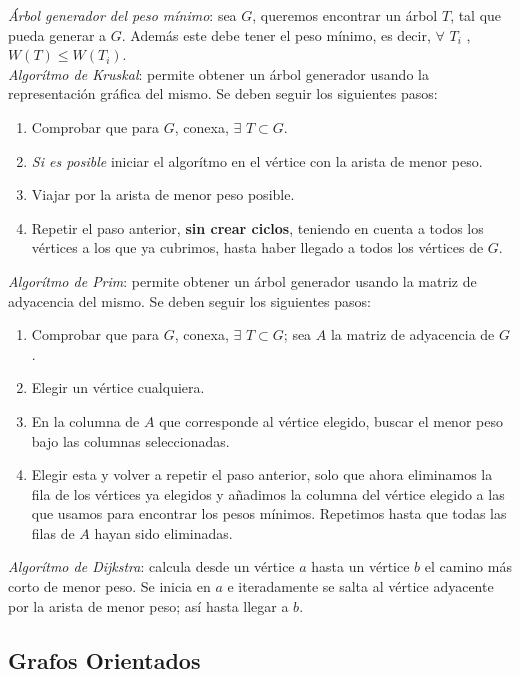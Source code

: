 \documentclass[titlepage,a4paper,12pt,twoside]{article}
\begin{document}
\textit{Árbol generador del peso mínimo}: sea $G$, queremos encontrar un árbol $T$, tal que pueda generar a $G$. Además este debe tener el peso mínimo, es decir, $\forall $ $ T_{i} $ , $W(T) \leqslant W(T_{i})$.\\

\textit{Algorítmo de Kruskal}: permite obtener un árbol generador usando la representación gráfica del mismo. Se deben seguir los siguientes pasos:
\begin{enumerate}
\item Comprobar que para $G$, conexa, $ \exists $ $T \subset G$.
\item \textit{Si es posible} iniciar el algorítmo en el vértice con la arista de menor peso.
\item Viajar por la arista de menor peso posible.
\item Repetir el paso anterior, \textbf{sin crear ciclos}, teniendo en cuenta a todos los vértices a los que ya cubrimos, hasta haber llegado a todos los vértices de $G$.
\end{enumerate}

\textit{Algorítmo de Prim}: permite obtener un árbol generador usando la matriz de adyacencia del mismo. Se deben seguir los siguientes pasos:
\begin{enumerate}
\item Comprobar que para $G$, conexa, $ \exists $ $T \subset G$; sea $A$ la matriz de adyacencia de $G$.
\item Elegir un vértice cualquiera.
\item En la columna de $A$ que corresponde al vértice elegido, buscar el menor peso bajo las columnas seleccionadas.
\item Elegir esta y volver a repetir el paso anterior, solo que ahora eliminamos la fila de los vértices ya elegidos y añadimos la columna del vértice elegido a las que usamos para encontrar los pesos mínimos. Repetimos hasta que todas las filas de $A$ hayan sido eliminadas. 
\end{enumerate}

\textit{Algorítmo de Dijkstra}: calcula desde un vértice $a$ hasta un vértice $b$ el camino más corto de menor peso. Se inicia en $a$ e iteradamente se salta al vértice adyacente por la arista de menor peso; así hasta llegar a $b$.

\subsection{Grafos Orientados}
\end{document}
